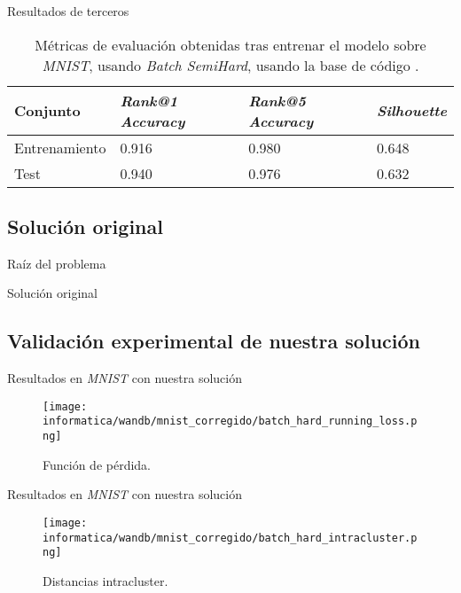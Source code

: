 \begin{frame}{Resultados de terceros}

	\begin{table}[!hbtp]
		\centering
		\begin{tabular}{|l|l|l|l|}
			\hline
			Conjunto      & \textit{Rank@1 Accuracy} & \textit{Rank@5 Accuracy} & \textit{Silhouette} \\
			\hline

			Entrenamiento & 0.916                    & 0.980                    & 0.648               \\
			Test          & 0.940                    & 0.976                    & 0.632               \\

			\hline
		\end{tabular}
		\caption{Métricas de evaluación obtenidas tras entrenar el modelo sobre \textit{MNIST}, usando \textit{Batch SemiHard}, usando la base de código \cite{informatica:adambielski_github}.}
		\label{table:resultados_adam_mnist_random}
	\end{table}

\end{frame}

\subsection{Solución original}
\begin{frame}{Raíz del problema}
\end{frame}


\begin{frame}{Solución original}
\end{frame}

\subsection{Validación experimental de nuestra solución}
\begin{frame}{Resultados en \textit{MNIST} con nuestra solución}

	\begin{figure}
		\texttt{[image: informatica/wandb/mnist\_corregido/batch\_hard\_running\_loss.png]}
		\caption{Función de pérdida.}
	\end{figure}
\end{frame}

\begin{frame}{Resultados en \textit{MNIST} con nuestra solución}

	\begin{figure}
		\texttt{[image: informatica/wandb/mnist\_corregido/batch\_hard\_intracluster.png]}
		\caption{Distancias intracluster.}
	\end{figure}

\end{frame}

